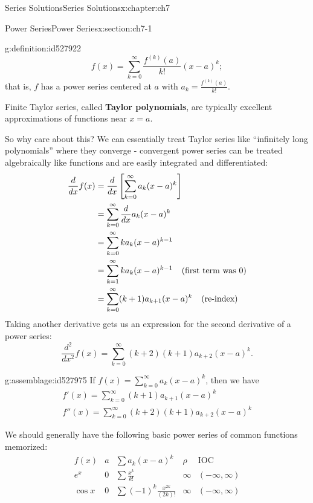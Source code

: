 \documentclass[oneside,10pt,]{book}
\newcommand{\terminology}[1]{\textbf{#1}}
\numberwithin{equation}{section}
\numberwithin{equation}{section}
\newcommand{\amp}{&}
\begin{document}
\begin{chapterptx}{Series Solutions}{}{Series Solutions}{}{}{x:chapter:ch7}
\begin{sectionptx}{Power Series}{}{Power Series}{}{}{x:section:ch7-1}
\begin{definition}{}{g:definition:id527922}
\begin{equation*}
f(x) = \sum_{k=0}^\infty \frac{f^{(k)}(a)}{k!}(x-a)^k;
\end{equation*}
that is, \(f\) has a power series centered at \(a\) with \(a_k = \frac{f^{(k)}(a)}{k!}\).\end{definition}
 Finite Taylor series, called \terminology{Taylor polynomials}, are typically excellent approximations of functions near \(x=a\).%
\par
So why care about this? We can essentially treat Taylor series like ``infinitely long polynomials'' where they converge - convergent power series can be treated algebraically like functions and are easily integrated and differentiated:%
\begin{align*}
\frac{d}{dx} f(x) \amp = \frac{d}{dx} \left[\sum_{k=0}^\infty a_k (x-a)^k\right]\\
\amp= \sum_{k=0}^\infty \frac{d}{dx} a_k (x-a)^k\\
\amp = \sum_{k=0}^\infty k a_k (x-a)^{k-1}\\
\amp = \sum_{k=1}^\infty k a_k (x-a)^{k-1} \hspace{.1in} \text { (first term was 0)}\\
\amp = \sum_{k=0}^\infty (k+1) a_{k+1} (x-a)^k \hspace{.1in} \text{ (re-index)}
\end{align*}
Taking another derivative gets us an expression for the second derivative of a power series:%
\begin{equation*}
\frac{d^2}{dx^2} f(x) = \sum_{k=0}^\infty (k+2)(k+1) a_{k+2} (x-a)^k.
\end{equation*}
%
\begin{assemblage}{}{g:assemblage:id527975}%
If \(f(x) = \sum_{k=0}^\infty a_k (x-a)^k\), then we have%
\begin{gather*}
f'(x) = \sum_{k=0}^\infty (k+1)a_{k+1} (x-a)^k\\
f''(x) = \sum_{k=0}^\infty (k+2)(k+1) a_{k+2} (x-a)^k
\end{gather*}
%
\end{assemblage}
We should generally have the following basic power series of common functions memorized:%
\begin{equation*}
\begin{array}{c|c|c|c|c}
f(x) \amp a \amp \sum a_k (x-a)^k \amp \rho \amp \text{IOC} \\ \hline
e^x \amp 0 \amp \sum \frac{x^k}{k!} \amp \infty \amp (-\infty, \infty) \\
\cos x \amp 0 \amp \sum (-1)^k \frac{x^{2k}}{(2k)!} \amp \infty \amp (-\infty, \infty) \\

\end{array}
\end{equation*}
\end{sectionptx}
\end{chapterptx}
\end{document}
